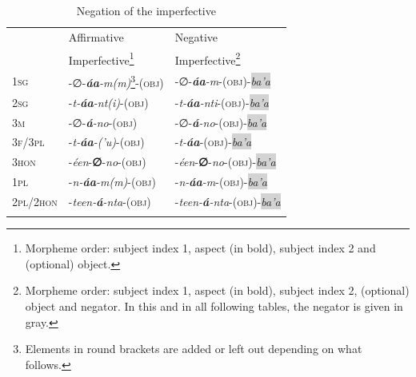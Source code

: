 \documentclass[output=paper,colorlinks,citecolor=brown,draftmode
]{langscibook}
\begin{document}
\begin{table}
\caption{Negation of the imperfective}
\label{tab:treis:2}
 \begin{tabularx}{\textwidth}{lXl}
  \lsptoprule
& Affirmative & Negative \\
& Imperfective\footnote{Morpheme order: subject index 1, aspect (in bold), subject index 2 and (optional) object.} & Imperfective\footnote{Morpheme order: subject index 1, aspect (in bold), subject index 2, (optional) object and negator.  In this and in all following tables, the negator is given in gray.} \\ 
    \midrule 
\textsc{1sg} & -∅-\textit{\textbf{áa}-m(m)}\footnote{Elements in round brackets are added or left out depending on what follows.}-(\textsc{obj}) &  -∅-\textit{\textbf{áa}-m}-(\textsc{obj})-\textit{\colorbox{lightgray}{ba'a}} \\
\textsc{2sg} & -\textit{t-\textbf{áa}-nt(i)}-(\textsc{obj}) & -\textit{t-\textbf{áa}-nti}-(\textsc{obj})-\textit{\colorbox{lightgray}{ba'a}} \\
\textsc{3m} & -∅-\textit{\textbf{á}-no}-(\textsc{obj}) &  -∅-\textit{\textbf{á}-no}-(\textsc{obj})-\textit{\colorbox{lightgray}{ba'a}}  \\
\textsc{3f/3pl} & -\textit{t-\textbf{áa}-(’u)}-(\textsc{obj}) & -\textit{t-\textbf{áa}}-(\textsc{obj})-\textit{\colorbox{lightgray}{ba'a}} \\
\textsc{3hon} & -\textit{éen}-\textbf{∅}-\textit{no}-(\textsc{obj}) &  -\textit{éen}-\textbf{∅}-\textit{no}-(\textsc{obj})-\textit{\colorbox{lightgray}{ba'a}}  \\
\textsc{1pl} & -\textit{n-\textbf{áa}-m(m)}-(\textsc{obj}) & -\textit{n-\textbf{áa}-m}-(\textsc{obj})-\textit{\colorbox{lightgray}{ba'a}}  \\
\textsc{2pl/2hon} & -\textit{teen-\textbf{á}-nta}-(\textsc{obj}) & -\textit{teen-\textbf{á}-nta}-(\textsc{obj})-\textit{\colorbox{lightgray}{ba'a}} \\
  \lspbottomrule
 \end{tabularx}
\end{table}
\end{document}
